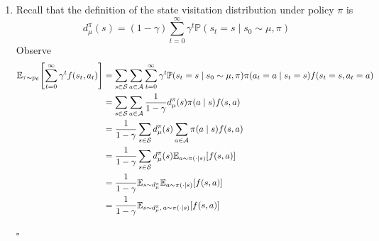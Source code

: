 \begin{Solution}
    \begin{enumerate} [label=\alph*)]
        \item
        Recall that the definition of the state visitation distribution under policy $\pi$ is
        $$
        d_\mu^\pi(s) = (1 - \gamma) \sum_{t=0}^\infty \gamma^t \mathbb{P}(s_t = s \mid s_0 \sim \mu, \pi)
        $$
        Observe
        $$
        \begin{aligned}
        \mathbb{E}_{\tau\sim p_\theta}{\left[\sum_{t=0}^\infty\gamma^t f(s_t, a_t)\right]}
        & = \sum_{s \in \mathcal{S}} \sum_{a \in \mathcal{A}} \sum_{t=0}^\infty \gamma^t \mathbb{P}(s_t = s \mid s_0 \sim \mu, \pi) \pi(a_t = a \mid s_t = s) f(s_t = s, a_t = a) \\
        & = \sum_{s \in \mathcal{S}} \sum_{a \in \mathcal{A}} \dfrac{1}{1 - \gamma} d_\mu^\pi(s) \pi(a \mid s) f(s, a) \\
        & = \dfrac{1}{1 - \gamma} \sum_{s \in \mathcal{S}}  d_\mu^\pi(s) \sum_{a \in \mathcal{A}} \pi(a \mid s) f(s, a) \\
        & = \dfrac{1}{1 - \gamma} \sum_{s \in \mathcal{S}}  d_\mu^\pi(s) \mathbb{E}_{a \sim \pi(\cdot \mid s)} {\left[f(s,a)\right]} \\
        & = \dfrac{1}{1 - \gamma} \mathbb{E}_{s \sim d_\mu^\pi} \mathbb{E}_{a \sim \pi(\cdot \mid s)} {\left[f(s,a)\right]} \\
        & = \frac{1}{1-\gamma}\mathbb{E}_{s\sim d_{\mu}^{\pi},\,a\sim\pi(\cdot | s)}{\left[f(s,a)\right]}
        \end{aligned}
        $$ \begin{flushright} $\square$ \end{flushright}
        

\end{enumerate}
\end{Solution}
